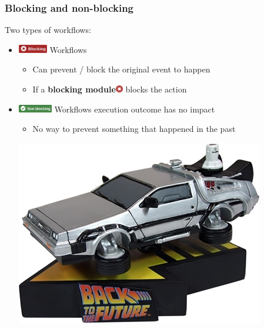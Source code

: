 \begin{frame}
    \frametitle{Blocking and non-blocking}
    Two types of workflows:
    \vspace{0.5em}
    \begin{itemize}
        \item[] \hspace*{-2em}\includegraphics[valign=m,width=48px]{pictures/blocking-workflow.png} Workflows
        \begin{itemize}
            \item Can prevent / block the original event to happen
            \item If a \textbf{blocking module}\includegraphics[valign=b,width=12px]{pictures/blocking-module.png} blocks the action
        \end{itemize}
        \vspace{0.5em}
        \item[] \hspace*{-2em}\includegraphics[valign=b,width=56px]{pictures/non-blocking-workflow.png} Workflows execution outcome has no impact
        \begin{itemize}
            \item No way to prevent something that happened in the past
        \end{itemize}
        \begin{center}
            \includegraphics[width=0.3\linewidth]{pictures/time-machine.png}
        \end{center}
    \end{itemize}
\end{frame}

